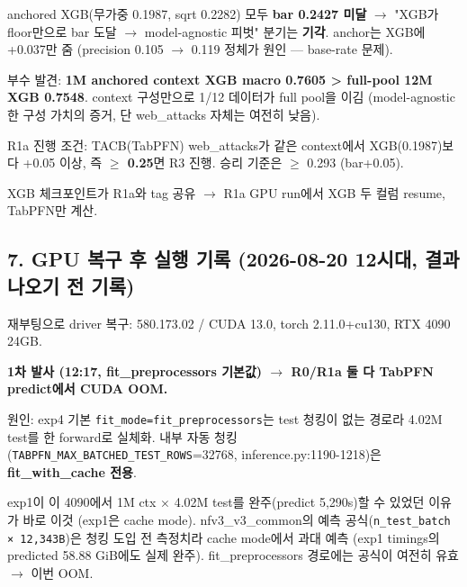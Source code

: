 \par\noindent \textbullet\enspace anchored XGB(무가중 0.1987, sqrt 0.2282) 모두 \textbf{bar 0.2427 미달}  \ensuremath{\rightarrow}  "XGB가 floor만으로 bar 도달  \ensuremath{\rightarrow}  model-agnostic 피벗" 분기는 \textbf{기각}. anchor는 XGB에 +\allowbreak{}0.037만 줌 (precision 0.105 \ensuremath{\rightarrow} 0.119 정체가 원인 — base-rate 문제).


\par\noindent \textbullet\enspace 부수 발견: \textbf{1M anchored context XGB macro 0.7605 > full-pool 12M XGB 0.7548}. context 구성만으로 1/\allowbreak{}12 데이터가 full pool을 이김 (model-agnostic한 구성 가치의 증거, 단 web\_\allowbreak{}attacks 자체는 여전히 낮음).


\par\noindent \textbullet\enspace R1a 진행 조건: TACB(TabPFN) web\_\allowbreak{}attacks가 같은 context에서 XGB(0.1987)보다 +\allowbreak{}0.05 이상, 즉 \textbf{\ensuremath{\geq} 0.25}면 R3 진행. 승리 기준은 \ensuremath{\geq} 0.293 (bar+\allowbreak{}0.05).


\par\noindent \textbullet\enspace XGB 체크포인트가 R1a와 tag 공유  \ensuremath{\rightarrow}  R1a GPU run에서 XGB 두 컬럼 resume, TabPFN만 계산.


\subsection{7. GPU 복구 후 실행 기록 (2026-08-20 12시대, 결과 나오기 전 기록)}
재부팅으로 driver 복구: 580.173.02 /\allowbreak{} CUDA 13.0, torch 2.11.0+\allowbreak{}cu130, RTX 4090 24GB.

\textbf{1차 발사 (12:17, fit\_\allowbreak{}preprocessors 기본값)  \ensuremath{\rightarrow}  R0/\allowbreak{}R1a 둘 다 TabPFN predict에서 CUDA OOM.}

\par\noindent \textbullet\enspace 원인: exp4 기본 \texttt{fit\_\allowbreak{}\allowbreak{}mode\allowbreak{}=\allowbreak{}\allowbreak{}fit\_\allowbreak{}\allowbreak{}pre\allowbreak{}processo\allowbreak{}rs}는 test 청킹이 없는 경로라 4.02M test를 한 forward로 실체화. 내부 자동 청킹(\texttt{TABPFN\_\allowbreak{}\allowbreak{}M\allowbreak{}AX\_\allowbreak{}\allowbreak{}BATCH\allowbreak{}ED\_\allowbreak{}\allowbreak{}TEST\_\allowbreak{}\allowbreak{}ROWS}=\allowbreak{}32768, inference.py:1190-1218)은 \textbf{fit\_\allowbreak{}with\_\allowbreak{}cache 전용}.


\par\noindent \textbullet\enspace exp1이 이 4090에서 1M ctx × 4.02M test를 완주(predict 5,290s)할 수 있었던 이유가 바로 이것 (exp1은 cache mode). nfv3\_\allowbreak{}v3\_\allowbreak{}common의 예측 공식(\texttt{n\_\allowbreak{}\allowbreak{}test\_\allowbreak{}\allowbreak{}b\allowbreak{}atch × 1\allowbreak{}2,\allowbreak{}343B})은 청킹 도입 전 측정치라 cache mode에서 과대 예측 (exp1 timings의 predicted 58.88 GiB에도 실제 완주). fit\_\allowbreak{}preprocessors 경로에는 공식이 여전히 유효  \ensuremath{\rightarrow}  이번 OOM.


